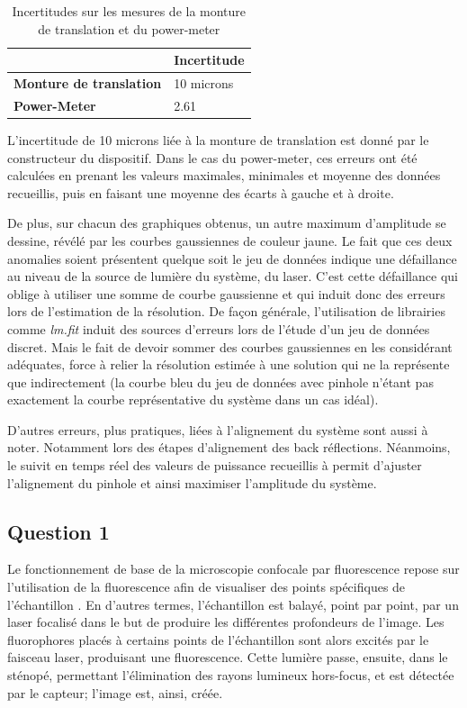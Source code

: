 \documentclass[11pt,letterpaper]{article}
\begin{document}
\begin{table}[H]
\centering
\begin{tabular}{|p{4.8cm}|p{4.2cm}|}
\cline{2-2}
\multicolumn{1}{c|}{} & \textbf{Incertitude} \\
\hline
\textbf{Monture de translation} & 10 microns\\
\hline
\textbf{Power-Meter} & 2.61\\
\hline
\end{tabular}
\caption{Incertitudes sur les mesures de la monture de translation et du power-meter}
\label{incertitudes}
\end{table}

L'incertitude de 10 microns liée à la monture de translation est donné par le constructeur du dispositif. Dans le cas du power-meter, ces erreurs ont été calculées en prenant les valeurs maximales, minimales et moyenne des données recueillis, puis en faisant une moyenne des écarts à gauche et à droite.

De plus, sur chacun des graphiques obtenus, un autre maximum d'amplitude se dessine, révélé par les courbes gaussiennes de couleur jaune. Le fait que ces deux anomalies soient présentent quelque soit le jeu de données indique une défaillance au niveau de la source de lumière du système, du laser. C'est cette défaillance qui oblige à utiliser une somme de courbe gaussienne et qui induit donc des erreurs lors de l'estimation de la résolution. De façon générale, l'utilisation de librairies comme \textit{lm.fit} induit des sources d'erreurs lors de l'étude d'un jeu de données discret. Mais le fait de devoir sommer des courbes gaussiennes en les considérant adéquates, force à relier la résolution estimée à une solution qui ne la représente que indirectement (la courbe bleu du jeu de données avec pinhole n'étant pas exactement la courbe représentative du système dans un cas idéal).

D'autres erreurs, plus pratiques, liées à l'alignement du système sont aussi à noter. Notamment lors des étapes d'alignement des back réflections. Néanmoins, le suivit en temps réel des valeurs de puissance recueillis à permit d'ajuster l'alignement du pinhole et ainsi maximiser l'amplitude du système. 
\subsection{Question 1}

Le fonctionnement de base de la microscopie confocale par fluorescence repose sur l'utilisation de la fluorescence afin de visualiser des points spécifiques de l'échantillon \cite{elliott_confocal_2020}. En d'autres termes, l'échantillon est balayé, point par point, par un laser focalisé dans le but de produire les différentes profondeurs de l'image. Les fluorophores placés à certains points de l'échantillon sont alors excités par le faisceau laser, produisant une fluorescence. Cette lumière passe, ensuite, dans le sténopé, permettant l'élimination des rayons lumineux hors-focus, et est détectée par le capteur; l'image est, ainsi, créée.
\end{document}
